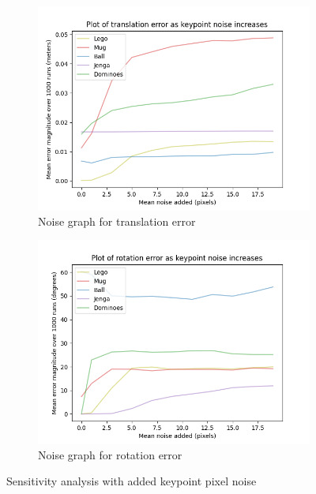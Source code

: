 \begin{figure}[h]
    \centering
    \begin{subfigure}[t]{0.49\textwidth}
        \includegraphics[width=\textwidth]{figures/fig_pixel_noise-translation.png}
        \caption{Noise graph for translation error}
        \label{fig:noise-pixel-translation}
    \end{subfigure}
    \hfill
    \begin{subfigure}[t]{0.49\textwidth}
        \includegraphics[width=\textwidth]{figures/fig_pixel_noise-rotation.png}
        \caption{Noise graph for rotation error}
        \label{fig:noise-pixel-rotation}
    \end{subfigure}
    \caption{Sensitivity analysis with added keypoint pixel noise}
    \label{fig:noise-pixel}
\end{figure}


